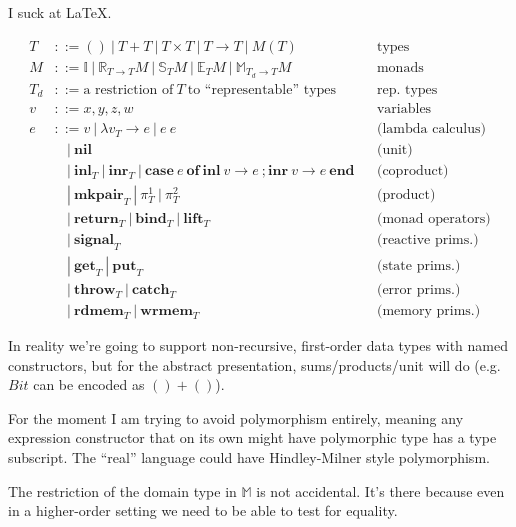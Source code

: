 \documentclass{article}[11pt]
\begin{document}
I suck at \LaTeX.

$$
\begin{aligned}
T &::= ()~ |~ T + T~ |~ T \times T~ |~ T \rightarrow T~ |~ M(T) && \text{types}\\
M &::= \mathbb{I}~ |~ \mathbb{R}_{T\rightarrow{}T} M~ |~ \mathbb{S}_T M~ |~ \mathbb{E}_T M~ |~ \mathbb{M}_{T_d\rightarrow{}T} M&&\text{monads}\\
T_d &::= \text{a restriction of}~ T~ \text{to ``representable'' types}&&\text{rep. types}\\
v &::= x, y, z, w&&\text{variables}\\
e &::= v~ |~ \lambda{}v_T\rightarrow{}e~ |~ e~ e&&\text{(lambda calculus)}\\
  &~~~~|~ \textbf{nil}&&\text{(unit)}\\
  &~~~~|~ \textbf{inl}_T~ |~ \textbf{inr}_T~ |~ \textbf{case}~ e~ \textbf{of}~ \textbf{inl}~ v \rightarrow e~ ; \textbf{inr}~ v \rightarrow e~ \textbf{end}&&\text{(coproduct)}\\
  &~~~~|~ \textbf{mkpair}_T~ |~ \pi^1_T~ |~ \pi^2_T&&\text{(product)}\\
  &~~~~|~ \textbf{return}_T~ |~ \textbf{bind}_T~ |~ \textbf{lift}_T&&\text{(monad operators)}\\
  &~~~~|~ \textbf{signal}_T&&\text{(reactive prims.)}\\
  &~~~~|~ \textbf{get}_T~ |~ \textbf{put}_T&&\text{(state prims.)}\\
  &~~~~|~ \textbf{throw}_T~ |~ \textbf{catch}_T&&\text{(error prims.)}\\
  &~~~~|~ \textbf{rdmem}_T~ |~ \textbf{wrmem}_T&&\text{(memory prims.)}
\end{aligned}
$$

In reality we're going to support non-recursive, first-order data types with named constructors, but for the abstract presentation, sums/products/unit will do (e.g. $Bit$ can be encoded as $() + ()$).

For the moment I am trying to avoid polymorphism entirely, meaning any expression constructor that on its own might have polymorphic type has a type subscript. The ``real'' language could have Hindley-Milner style polymorphism.

The restriction of the domain type in $\mathbb{M}$ is not accidental. It's there because even in a higher-order setting we need to be able to test for equality.
\end{document}
